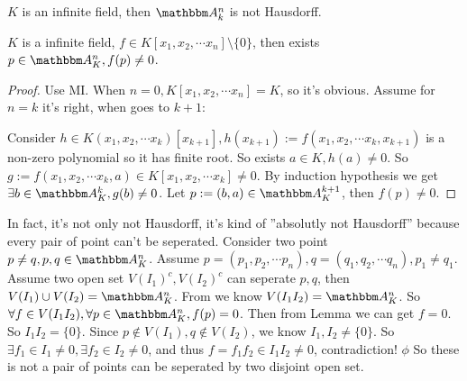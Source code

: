 \documentclass{ctexart}
\begin{document}
\begin{problem}
$K$ is an infinite field, then $\A_k^n$ is not Hausdorff.
\end{problem}
\begin{solution}
	\begin{lemma}
		\label{lem:2}
		$K$ is a infinite field, $f\in K[x_1,x_2,\cdots x_n]\setminus \{0\}$, then exists $p\in \A_K^n,f(p)\neq 0$.
	\end{lemma}
	\begin{proof}
		Use MI. When $n=0,K[x_1,x_2,\cdots x_n]=K$, so it's obvious. Assume for $n=k$ it's right, when goes to $k+1$:

		Consider $h\in K(x_1,x_2,\cdots x_k)[x_{k+1}],h(x_{k+1}):=f(x_1,x_2,\cdots x_k,x_{k+1})$ is a non-zero polynomial so it has finite root. So exists $a\in K,h(a)\neq 0$. So $g:=f(x_1,x_2,\cdots x_k,a)\in K[x_1,x_2,\cdots x_k]\neq 0$.
		By induction hypothesis we get $\exists b\in \A_K^k,g(b)\neq 0$. Let $p:=(b,a)\in \A_K^{k+1}$, then $f(p)\neq 0$.
	\end{proof}
	In fact, it's not only not Hausdorff, it's kind of ''absolutly not Hausdorff'' because every pair of point can't be seperated.
	Consider two point $p\neq q,p,q\in \A_K^n$.
	Assume $p=(p_1,p_2,\cdots p_n),q=(q_1,q_2,\cdots q_n),p_1\neq q_1$. Assume two open set $V(I_1)^c,V(I_2)^c$ can seperate $p,q$, then $V(I_1)\cup V(I_2)=\A_K^n$.
	From  we know $V(I_1I_2)=\A_K^n$. So $\forall f\in V(I_1I_2),\forall p\in \A_K^n,f(p)=0$.
	Then from Lemma we can get $f=0$. So $I_1I_2=\{0\}$.
	Since $p\notin V(I_1),q\notin V(I_2)$, we know $I_1,I_2\neq \{0\}$. So $\exists f_1\in I_1\neq 0,\exists f_2\in I_2\neq 0$, and thus $f=f_1f_2\in I_1I_2\neq 0$, contradiction!
	\(\phi\)
  So these is not a pair of points can be seperated by two disjoint open set.
\end{solution}
\end{document}
